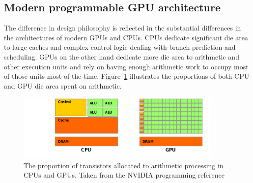 \subsection{Modern programmable GPU architecture}
The difference in design philosophy is reflected in the substantial differences in the architectures of modern GPUs and CPUs. CPUs dedicate significant die area to large caches and complex control logic dealing with
branch prediction and scheduling. GPUs on the other hand dedicate more die area to arithmetic and other execution units and rely on having enough arithmetic work to occupy most of those units most of the time.
Figure~\ref{fig_cpu_gpu_diff} illustrates the proportions of both CPU and GPU die area spent on arithmetic.
\begin{figure}[ht!]
 \begin{mdframed}
  \centering
  \includegraphics[width=0.9\textwidth]{images/gpu-devotes-more-transistors-to-data-processing.png}
  \caption[CPU vs. GPU architecture]{The proportion of transistors allocated to arithmetic processing in CPUs and GPUs. Taken from the NVIDIA programming reference \cite{cuda}}
  \label{fig_cpu_gpu_diff}
 \end{mdframed}
\end{figure}

